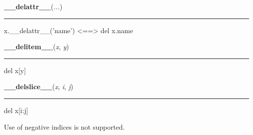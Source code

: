     \label{object:__delattr__}

    \vspace{0.5ex}

    \begin{boxedminipage}{\textwidth}

    \raggedright \textbf{\_\_delattr\_\_}(\textit{...})

    \vspace{-1.5ex}

    \rule{\textwidth}{0.5\fboxrule}

x.{\_}{\_}delattr{\_}{\_}('name') {\textless}=={\textgreater} del x.name
    \vspace{1ex}

    \end{boxedminipage}

    \label{list:__delitem__}

    \vspace{0.5ex}

    \begin{boxedminipage}{\textwidth}

    \raggedright \textbf{\_\_delitem\_\_}(\textit{x}, \textit{y})

    \vspace{-1.5ex}

    \rule{\textwidth}{0.5\fboxrule}

del x{[}y{]}
    \vspace{1ex}

    \end{boxedminipage}

    \label{list:__delslice__}

    \vspace{0.5ex}

    \begin{boxedminipage}{\textwidth}

    \raggedright \textbf{\_\_delslice\_\_}(\textit{x}, \textit{i}, \textit{j})

    \vspace{-1.5ex}

    \rule{\textwidth}{0.5\fboxrule}

del x{[}i:j{]}

Use of negative indices is not supported.
    \vspace{1ex}

    \end{boxedminipage}

